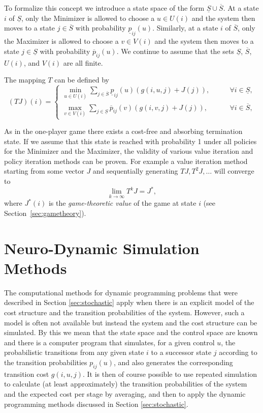 To formalize this concept we introduce a state space of the form $\underline S \cup \overline S$. At a state $i$ of $\underline S$, only the Minimizer is allowed to choose a $u \in U(i)$ and the system then moves to a state $j \in \overline S$ with probability $\underline p_{ij}(u)$. Similarly, at a state $i$ of $\overline S$, only the Maximizer is allowed to choose a $v \in V(i)$ and the system then moves to a state $j\in\underline S$ with probability $\overline p_{ij}(u)$. We continue to assume that the sets $\underline S$, $\overline S$, $U(i)$, and $V(i)$ are all finite.

The mapping $T$ can be defined by
\begin{equation} \label{eq:games:t}
(TJ)(i) = \left \{
\begin{array}{ll}
\min \limits_{u \in U(i)} \sum \limits_{j \in \overline S} \underline p_{ij}(u) \left ( g(i,u,j) + J(j) \right ),&  \qquad \forall i \in \underline S, \\
\max \limits_{v \in V(i)} \sum \limits_{j \in \underline S} \overline p_{ij}(v) \left ( g(i,v,j) + J(j) \right ), & \qquad \forall i \in \overline S,
\end{array} \right.
\end{equation}

As in the one-player game there exists a cost-free and absorbing termination state. If we assume that this state is reached with probability 1 under all policies for the Minimizer and the Maximizer, the validity of various value iteration and policy iteration methods can be proven. For example a value iteration method starting from some vector $J$ and sequentially generating $TJ, T^2J,\ldots$ will converge to
$$ \lim_{k \rightarrow \infty} T^kJ = J^*,$$
where $J^*(i)$ is the \emph{game-theoretic value} of the game at state $i$ (see Section~\ref{sec:gametheory}).










\section{Neuro-Dynamic Simulation Methods}
\label{sec:ndpsimulation}
The computational methods for dynamic programming problems that were described in Section \ref{sec:stochastic} apply when there is an explicit model of the cost structure and the transition probabilities of the system. However, such a model is often not available but instead the system and the cost structure can be simulated. By this we mean that the state space and the control space are known and there is a computer program that simulates, for a given control $u$, the probabilistic transitions from any given state $i$ to a successor state $j$ according to the transition probabilities $p_{ij}(u)$, and also generates the corresponding transition cost $g(i,u,j)$. It is then of course possible to use repeated simulation to calculate (at least approximately) the transition probabilities of the system and the expected cost per stage by averaging, and then to apply the dynamic programming methods discussed in Section \ref{sec:stochastic}.

